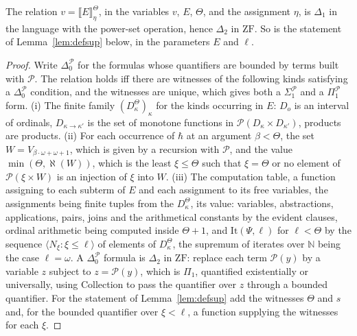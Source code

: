 \documentclass[10pt]{article}
\newcommand{\N}{\mathbb{N}}
\newcommand{\ZF}{\mathrm{ZF}}
\newcommand{\PP}{\mathcal{P}}
\newcommand{\sem}[1]{\llbracket #1\rrbracket}
\newcommand{\hartogs}{\aleph}
\begin{document}
\begin{lemma}\label{lem:complexity}
The relation $v=\sem E^\Theta_\eta$, in the variables $v$, $E$, $\Theta$, and
the assignment $\eta$, is $\Delta_1$ in the language with the power-set
operation, hence $\Delta_2$ in $\ZF$. So is the statement of
Lemma~\ref{lem:defsup} below, in the parameters $E$ and $\ell$.
\end{lemma}
\begin{proof}
Write $\Delta_0^{\PP}$ for the formulas whose quantifiers are bounded by
terms built with $\PP$. The relation holds iff there are witnesses of
the following kinds satisfying a $\Delta_0^{\PP}$ condition, and the
witnesses are unique, which gives both a $\Sigma_1^{\PP}$ and a $\Pi_1^{\PP}$
form. (i) The finite family $(D^\Theta_\kappa)_\kappa$ for the kinds occurring in
$E$: $D_o$ is an interval of ordinals, $D_{\kappa\to\kappa'}$ is the set of
monotone functions in $\PP(D_\kappa\times D_{\kappa'})$, products are products.
(ii) For each occurrence of $\hbar$ at an argument $\beta<\Theta$, the set
$W=V_{\beta\cdot\omega+\omega+1}$, which is given by a recursion with $\PP$, and the
value $\min(\Theta,\hartogs(W))$, which is the least $\xi\le\Theta$ such that
$\xi=\Theta$ or no element of $\PP(\xi\times W)$ is an injection of $\xi$ into
$W$. (iii) The computation table, a function assigning to each subterm
of $E$ and each assignment to its free variables, the assignments being
finite tuples from the $D^\Theta_\kappa$, its value: variables, abstractions,
applications, pairs, joins and the arithmetical constants by the evident
clauses, ordinal arithmetic being computed inside $\Theta+1$, and
$\mathrm{It}(\Psi,\ell)$ for $\ell<\Theta$ by the sequence
$\langle N_\xi:\xi\le\ell\rangle$ of elements of $D^\Theta_\kappa$, the supremum of
iterates over $\N$ being the case $\ell=\omega$. A $\Delta_0^{\PP}$ formula is
$\Delta_2$ in $\ZF$: replace each term $\PP(y)$ by a variable $z$ subject to
$z=\PP(y)$, which is $\Pi_1$, quantified existentially or universally,
using Collection to pass the quantifier over $z$ through a bounded
quantifier. For the statement of Lemma~\ref{lem:defsup} add the witnesses
$\Theta$ and $s$ and, for the bounded quantifier over $\xi<\ell$, a function
supplying the witnesses for each $\xi$.
\end{proof}
\end{document}
